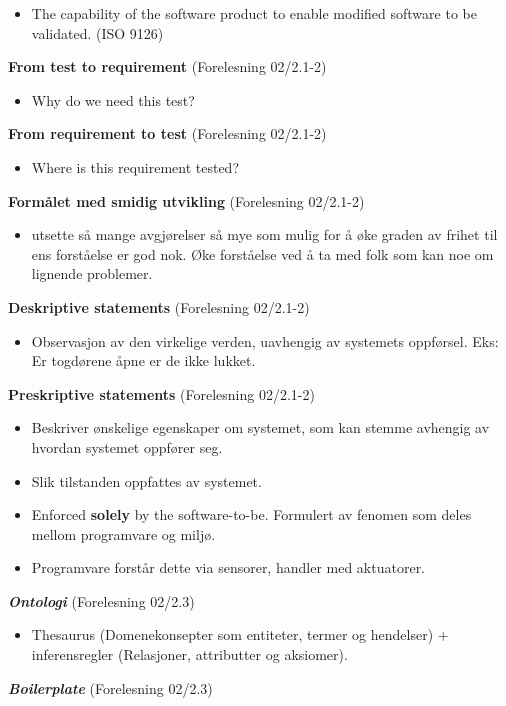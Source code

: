 \begin{itemize}
\item
  The capability of the software product to enable modified software to
  be validated. (ISO 9126)
\end{itemize}
\textbf{From test to requirement} (Forelesning 02/2.1-2)

\begin{itemize}
\item
  Why do we need this test?
\end{itemize}
\textbf{From requirement to test} (Forelesning 02/2.1-2)

\begin{itemize}
\item
  Where is this requirement tested?
\end{itemize}
\textbf{Formålet med smidig utvikling} (Forelesning 02/2.1-2)

\begin{itemize}
\item
  utsette så mange avgjørelser så mye som mulig for å øke graden av
  frihet til ens forståelse er god nok. Øke forståelse ved å ta med folk
  som kan noe om lignende problemer.
\end{itemize}
\textbf{Deskriptive statements} (Forelesning 02/2.1-2)

\begin{itemize}
\item
  Observasjon av den virkelige verden, uavhengig av systemets oppførsel.
  Eks: Er togdørene åpne er de ikke lukket.
\end{itemize}
\textbf{Preskriptive statements} (Forelesning 02/2.1-2)

\begin{itemize}
\item
  Beskriver ønskelige egenskaper om systemet, som kan stemme avhengig av
  hvordan systemet oppfører seg.
\item
  Slik tilstanden oppfattes av systemet.
\item
  Enforced \textbf{solely} by the software-to-be. Formulert av fenomen
  som deles mellom programvare og miljø.
\item
  Programvare forstår dette via sensorer, handler med aktuatorer.
\end{itemize}
\textbf{\emph{Ontologi}} (Forelesning 02/2.3)

\begin{itemize}
\item
  Thesaurus (Domenekonsepter som entiteter, termer og hendelser) +
  inferensregler (Relasjoner, attributter og aksiomer).
\end{itemize}
\textbf{\emph{Boilerplate}} (Forelesning 02/2.3)

